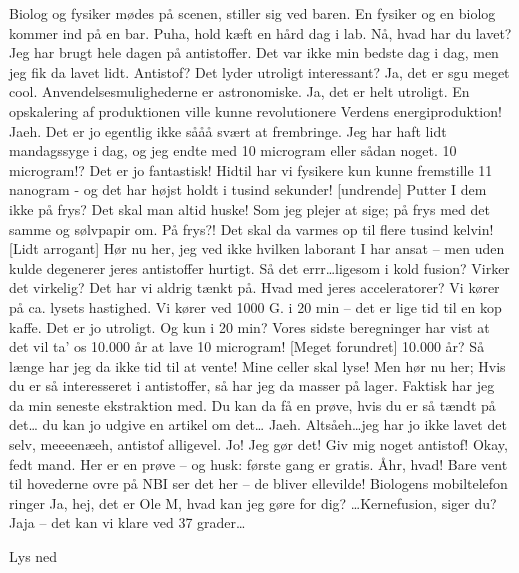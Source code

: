 \documentclass[a4paper,12pt]{article}
\begin{document}
\begin{sketch}


\scene Biolog og fysiker mødes på scenen, stiller sig ved baren.
 En fysiker og en biolog kommer ind på en bar.
 Puha, hold kæft en hård dag i lab. 
 Nå, hvad har du lavet? 
 Jeg har brugt hele dagen på antistoffer. Det var ikke min bedste dag i dag, men jeg fik da lavet lidt.
 Antistof? Det lyder utroligt interessant? 
 Ja, det er sgu meget cool. Anvendelsesmulighederne er astronomiske.
 Ja, det er helt utroligt. En opskalering af produktionen ville kunne revolutionere Verdens energiproduktion! 
 Jaeh. Det er jo egentlig ikke sååå svært at frembringe. Jeg har haft lidt mandagssyge i dag, og jeg endte med 10 microgram eller sådan noget. 
 10 microgram!? Det er jo fantastisk! Hidtil har vi fysikere kun kunne fremstille 11 nanogram - og det har højst holdt i tusind sekunder!
[undrende] Putter I dem ikke på frys? Det skal man altid huske! Som jeg plejer at sige; på frys med det samme og sølvpapir om.
 På frys?! Det skal da varmes op til flere tusind kelvin!
[Lidt arrogant] Hør nu her, jeg ved ikke hvilken laborant I har ansat -- men uden kulde degenerer jeres antistoffer hurtigt.
 Så det errr\ldots ligesom i kold fusion? Virker det virkelig? Det har vi aldrig tænkt på. Hvad med jeres acceleratorer? Vi kører på ca. lysets hastighed.
 Vi kører ved 1000 G. i 20 min -- det er lige tid til en kop kaffe.
 Det er jo utroligt. Og kun i 20 min? Vores sidste beregninger har vist at det vil ta' os 10.000 år at lave 10 microgram!
[Meget forundret] 10.000 år? Så længe har jeg da ikke tid til at vente! Mine celler skal lyse! Men hør nu her; Hvis du er så interesseret i antistoffer, så har jeg da masser på lager. Faktisk har jeg da min seneste ekstraktion med.
 Du kan da få en prøve, hvis du er så tændt på det\ldots {} du kan jo udgive en artikel om det\ldots
{} Jaeh. Altsåeh\ldots jeg har jo ikke lavet det selv, meeeenæeh, antistof alligevel. Jo! Jeg gør det! Giv mig noget antistof!
 Okay, fedt mand. Her er en prøve -- og husk: første gang er gratis.
 Åhr, hvad! Bare vent til hovederne ovre på NBI ser det her -- de bliver ellevilde!
 Biologens mobiltelefon ringer
 Ja, hej, det er Ole M, hvad kan jeg gøre for dig? \ldots Kernefusion, siger du? Jaja -- det kan vi klare ved 37 grader\ldots

\scene Lys ned


\end{sketch}
\end{document}
